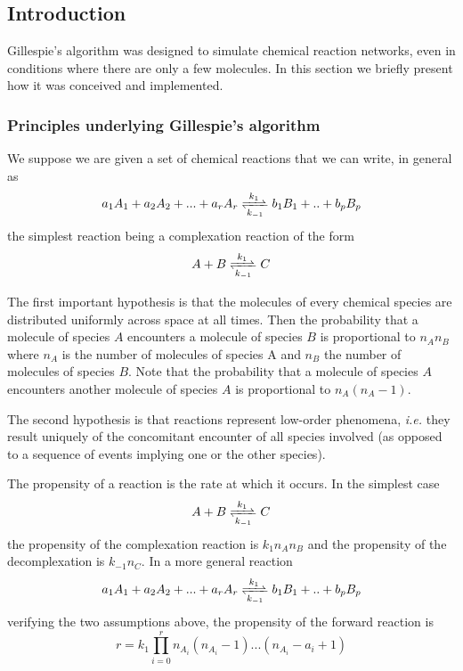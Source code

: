
\subsection{Introduction}

Gillespie's algorithm was designed to simulate chemical reaction networks, even in conditions where there are only a few molecules. In this section we briefly present how it was conceived and implemented.

\subsubsection{Principles underlying Gillespie's algorithm}

We suppose we are given a set of chemical reactions that we can write, in general as
\[
\reactionRev{a_1A_1 + a_2A_2 + ... + a_rA_r}{b_1B_1+..+b_pB_p}{k_1}{k_{-1}}
\]
the simplest reaction being a complexation reaction of the form
\[
\reactionRev{A + B}{C}{k_1}{k_{-1}}
\]

\begin {assum}
  The first important hypothesis is that the molecules of every chemical species are distributed uniformly across space at all times. Then the probability that a molecule of species $A$ encounters a molecule of species $B$ is proportional to $n_An_B$ where $n_A$ is the number of molecules of species A and $n_B$ the number of molecules of species $B$. Note that the probability that a molecule of species $A$ encounters another molecule of species $A$ is proportional to $n_A(n_A-1)$.
\end {assum}

\begin {assum}
  The second hypothesis is that reactions represent low-order phenomena, \textit{i.e.} they result uniquely of the concomitant encounter of all species involved (as opposed to a sequence of events implying one or the other species).
\end {assum}

\begin {defn}[Propensity]
  The propensity of a reaction is the rate at which it occurs. In the simplest case
\[
\reactionRev{A + B}{C}{k_1}{k_{-1}}
\]
the propensity of the complexation reaction is $k_1 n_A n_B$ and the propensity of the decomplexation is $k_{-1}n_C$. In a more general reaction
\[
\reactionRev{a_1A_1 + a_2A_2 + ... + a_rA_r}{b_1B_1+..+b_pB_p}{k_1}{k_{-1}}
\]
verifying the two assumptions above, the propensity of the forward reaction is
\[
r = k_1 \prod\limits_{i=0}^{r}n_{A_i}(n_{A_i}-1)...(n_{A_i}-a_i+1)
\]
\end {defn}


